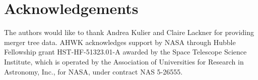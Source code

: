 \documentclass[fleqn,usenatbib,useAMS]{mnras}
\begin{document}
\section{Acknowledgements}
The authors would like to thank Andrea Kulier and Claire Lackner for providing merger tree data. AHWK acknowledges support by NASA through Hubble Fellowship grant HST-HF-51323.01-A awarded by the Space Telescope Science Institute, which is operated by the Association of Universities for Research in Astronomy, Inc., for NASA, under contract NAS 5-26555.








\bsp	%
\label{lastpage}
\end{document}
